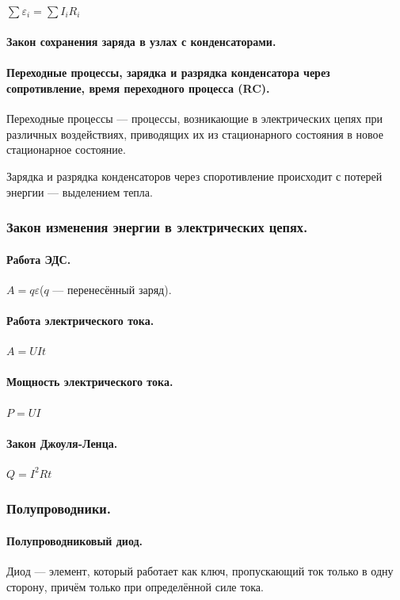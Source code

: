 \documentclass{article}
\begin{document}
                \(\sum{\varepsilon_i} = \sum{I_iR_i}\)
            \paragraph{Закон сохранения заряда в узлах с конденсаторами.}
            \paragraph{Переходные процессы, зарядка и разрядка конденсатора через сопротивление, время переходного процесса (RC).}
                Переходные процессы — процессы, возникающие в электрических цепях при различных воздействиях, приводящих их из стационарного состояния в новое стационарное состояние.

                Зарядка и разрядка конденсаторов через споротивление происходит с потерей энергии --- выделением тепла.

        \subsubsection{Закон изменения энергии в электрических цепях.}
            \paragraph{Работа ЭДС.}
                \(A = q\varepsilon\)(\(q\) --- перенесённый заряд).
            \paragraph{Работа электрического тока.}
                \(A = UIt\)
            \paragraph{Мощность электрического тока.}
                \(P = UI\)
            \paragraph{Закон Джоуля-Ленца.}
                \(Q = I^2Rt\)
        \subsubsection{Полупроводники.}
            \paragraph{Полупроводниковый диод.}
                Диод --- элемент, который работает как ключ, пропускающий ток только в одну сторону, причём только при определённой силе тока.
\end{document}
